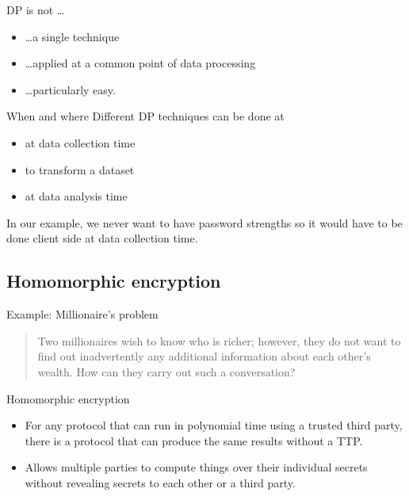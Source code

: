 \documentclass[xcolor={dvipsnames,table,hyperref}]{beamer}
\begin{document}
\begin{frame}{DP is not \dots}
  \begin{itemize}
    \item \dots a single technique
    \item \dots applied at a common point of data processing
    \item \dots particularly easy.
  \end{itemize}
\end{frame}

\begin{frame}{When and where}
  Different DP techniques can be done at
  \begin{itemize}
    \item at data collection time
    \item to transform a dataset
    \item at data analysis time
  \end{itemize}
  In our example, we never want to have password strengths so it would have to be done client side at data collection time.
\end{frame}

\subsection{Homomorphic encryption}

\begin{frame}{Example: Millionaire's problem}
  \blockcquote{yao1982protocols}{Two millionaires wish to know who is richer;
    however, they do not want to find out inadvertently any additional information about each other’s wealth. How can they carry out such a conversation?}
\end{frame}


\begin{frame}{Homomorphic encryption}
  \begin{itemize}
    \item For any protocol that can run in polynomial time using a trusted third party, there is a protocol that can produce the same results without a TTP\@.
    \item Allows multiple parties to compute things over their individual secrets without revealing secrets to each other or a third party.
  \end{itemize}
\end{frame}
\end{document}
